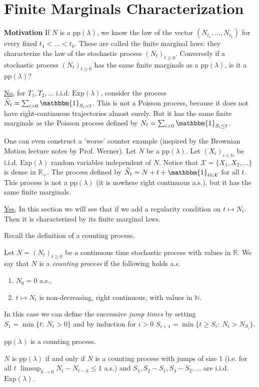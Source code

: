 \section{Finite Marginals Characterization}
\textbf{Motivation} If $N$ is a $ \textrm{pp} (\lambda )$, we know the law of the vector $(N_{t_1}, \ldots , N_{t_k})$ for every fixed $t_1 < \ldots < t_k$. These are called the finite marginal laws: they characterize the law of the stochastic process $(N_t)_{t\geq 0}$. Conversely if a stochastic process $(N_t)_{t\geq 0}$ has the same finite marginals as a $ \textrm{pp} (\lambda )$, is it a $ \textrm{pp} (\lambda )$?

\underline{No}, for $T_1, T_2, \ldots$ i.i.d. $ \textrm{Exp} (\lambda)$, consider the process $\widetilde{N}_{t} = \sum_{i> 0}^{} \mathbbm{1}_{S_i < t} $. This is not a Poisson process, because it does not have right-continuous trajectories almost surely. But it has the same finite marginals as the Poisson process defined by $N_t = \sum_{i> 0}^{}  \mathbbm{1}_{S_i \leq t} $.

One can even construct a 'worse' counter example (inspired by the Brownian Motion lecture notes by Prof. Werner). Let $N$ be a $ \textrm{pp} (\lambda )$. Let $(X_i)_{i \in \mathbb{N}}$ be i.i.d. $ \textrm{Exp} (\lambda )$ random variables independent of $N$. Notice that $\mathcal{X}= \{ X_1, X_2, \ldots \}$ is dense in $\mathbb{R}_+$. The process defined by $\widetilde{N}_{t} = N+t + \mathbbm{1}_{t\in \mathcal{X}} $ for all $t$. This process is not a $ \textrm{pp} (\lambda )$ (it is nowhere right continuous a.s.), but it has the same finite marginals.

\underline{Yes}, In this section we will see that if we add a regularity condition on $t \mapsto N_t$. Then it is characterized by its finite marginal laws. 

\noindent Recall the definition of a counting process.
\begin{defn}
	Let $N=(N_t)_{t \geq 0}$ be a continuous time stochastic process with values in $\mathbb{R}$. We say that $N$ is a \emph{counting process} if the following holds a.s.
\begin{enumerate}
	\item $N_0 = 0$ a.s.,
	\item  $t \mapsto N_t$ is non-decreasing, right continuous, with values in $\mathbb{N}$.
\end{enumerate}
In this case we can define the successive \emph{jump times} by setting $S_1=\min \{t:\ N_t>0\}$ and by induction for $i> 0$ $S_{i+1} = \min\{t \geq S_i: \ N_t > N_{S_i} \}$.
\end{defn}
{\color{blue}
\begin{ex}[]
	$ \textrm{pp}(\lambda )$ is a counting process.
\end{ex}}
\begin{rmk}[]
	$N$ is $ \textrm{pp} ( \lambda )$ if and only if $N$ is a counting process with jumps of size 1 (i.e. for all $t$ $\limsup_{h \to 0} N_t - N_{t-h} \leq 1$ a.s.) and $S_1, S_2 - S_1, S_3-S_2, \ldots$ are i.i.d. $ \textrm{Exp} (\lambda )$.
\end{rmk}

